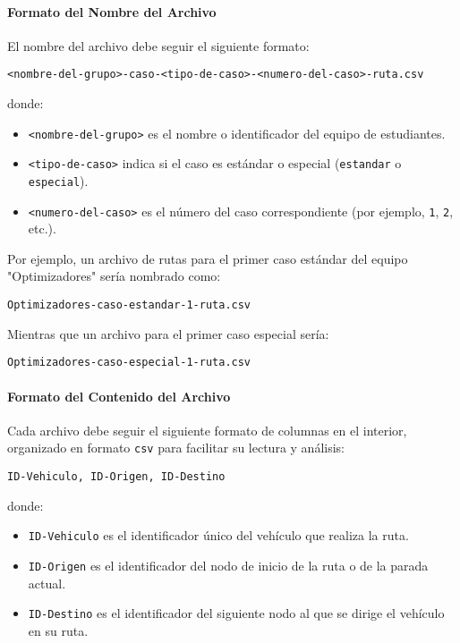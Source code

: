 \documentclass[12pt]{article}
\begin{document}
\paragraph{Formato del Nombre del Archivo}
El nombre del archivo debe seguir el siguiente formato:
\begin{center}
    \texttt{<nombre-del-grupo>-caso-<tipo-de-caso>-<numero-del-caso>-ruta.csv}
\end{center}
donde:
\begin{itemize}
    \item \texttt{<nombre-del-grupo>} es el nombre o identificador del equipo de estudiantes.
    \item \texttt{<tipo-de-caso>} indica si el caso es estándar o especial (\texttt{estandar} o \texttt{especial}).
    \item \texttt{<numero-del-caso>} es el número del caso correspondiente (por ejemplo, \texttt{1}, \texttt{2}, etc.).
\end{itemize}
Por ejemplo, un archivo de rutas para el primer caso estándar del equipo "Optimizadores" sería nombrado como:
\begin{center}
    \texttt{Optimizadores-caso-estandar-1-ruta.csv}
\end{center}
Mientras que un archivo para el primer caso especial sería:
\begin{center}
    \texttt{Optimizadores-caso-especial-1-ruta.csv}
\end{center}

\paragraph{Formato del Contenido del Archivo}
Cada archivo debe seguir el siguiente formato de columnas en el interior, organizado en formato \texttt{csv} para facilitar su lectura y análisis:

\begin{center}
    \texttt{ID-Vehiculo, ID-Origen, ID-Destino}
\end{center}

donde:
\begin{itemize}
    \item \texttt{ID-Vehiculo} es el identificador único del vehículo que realiza la ruta.
    \item \texttt{ID-Origen} es el identificador del nodo de inicio de la ruta o de la parada actual.
    \item \texttt{ID-Destino} es el identificador del siguiente nodo al que se dirige el vehículo en su ruta.
\end{itemize}
\end{document}
